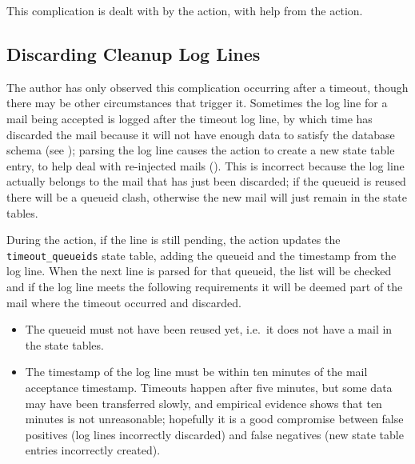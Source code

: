 This complication is dealt with by the  action, with help
from the  action.

\subsection{Discarding Cleanup Log Lines}

\label{discarding cleanup log lines}

The author has only observed this complication occurring after a timeout,
though there may be other circumstances that trigger it.  Sometimes the
 log line for a mail being accepted is logged after the
timeout log line, by which time \parsername{} has discarded the mail
because it will not have enough data to satisfy the database schema (see
); parsing the  log
line causes the  action to create a new state
table entry, to help deal with re-injected mails ().  This is incorrect because the log line actually belongs to the
mail that has just been discarded; if the queueid is reused there will be a
queueid clash, otherwise the new mail will just remain in the state tables.

During the  action, if the  line is still
pending, the action updates the \texttt{timeout\_queueids} state table,
adding the queueid and the timestamp from the log line.  When the next
 line is parsed for that queueid, the list will be checked
and if the log line meets the following requirements it will be deemed part
of the mail where the timeout occurred and discarded.

\begin{itemize}

    \item The queueid must not have been reused yet, i.e.\ it does not have
        a mail in the state tables.

    \item The timestamp of the  log line must be within ten
        minutes of the mail acceptance timestamp.  Timeouts happen after
        five minutes, but some data may have been transferred slowly, and
        empirical evidence shows that ten minutes is not unreasonable;
        hopefully it is a good compromise between false positives (log
        lines incorrectly discarded) and false negatives (new state table
        entries incorrectly created).

\end{itemize}

